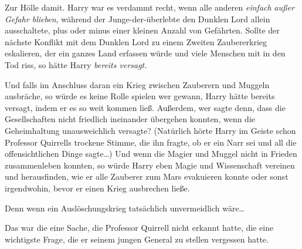 Zur Hölle damit. Harry war es verdammt recht, wenn alle anderen \emph{einfach} \emph{außer Gefahr blieben}, während der Junge-der-überlebte den Dunklen Lord allein ausschaltete, plus oder minus einer kleinen Anzahl von Gefährten. Sollte der nächste Konflikt mit dem Dunklen Lord zu einem Zweiten Zaubererkrieg eskalieren, der ein ganzes Land erfassen würde und viele Menschen mit in den Tod riss, so hätte Harry \emph{bereits versagt.}

Und falls im Anschluss daran ein Krieg zwischen Zauberern und Muggeln ausbräche, so würde es keine Rolle spielen wer gewann, Harry hätte bereits versagt, indem er es so weit kommen ließ. Außerdem, wer sagte denn, dass die Gesellschaften nicht friedlich ineinander übergehen konnten, wenn die Geheimhaltung unausweichlich versagte? (Natürlich hörte Harry im Geiste schon Professor Quirrells trockene Stimme, die ihn fragte, ob er ein Narr sei und all die offensichtlichen Dinge sagte…) Und wenn die Magier und Muggel nicht in Frieden zusammenleben konnten, so würde Harry eben Magie und Wissenschaft vereinen und herausfinden, wie er alle Zauberer zum Mars evakuieren konnte oder sonst irgendwohin, bevor er einen Krieg ausbrechen ließe.%

Denn wenn ein Auslöschungskrieg tatsächlich unvermeidlich wäre…

Das war die eine Sache, die Professor Quirrell nicht erkannt hatte, die eine wichtigste Frage, die er seinem jungen General zu stellen vergessen hatte.

